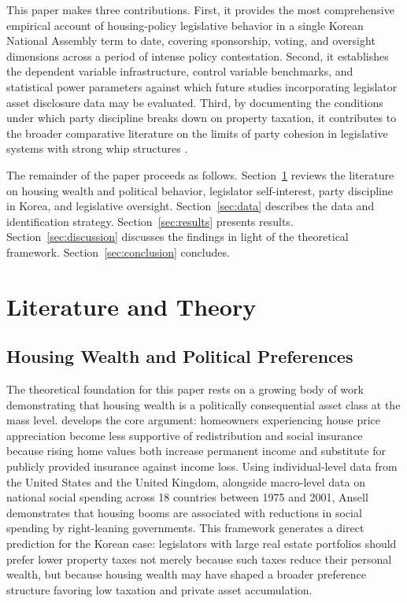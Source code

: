\documentclass[11pt]{article}
\begin{document}
This paper makes three contributions. First, it provides the most comprehensive empirical account of housing-policy legislative behavior in a single Korean National Assembly term to date, covering sponsorship, voting, and oversight dimensions across a period of intense policy contestation. Second, it establishes the dependent variable infrastructure, control variable benchmarks, and statistical power parameters against which future studies incorporating legislator asset disclosure data may be evaluated. Third, by documenting the conditions under which party discipline breaks down on property taxation, it contributes to the broader comparative literature on the limits of party cohesion in legislative systems with strong whip structures \citep{shinLee2015, kangPark2025}.

The remainder of the paper proceeds as follows. Section~\ref{sec:lit} reviews the literature on housing wealth and political behavior, legislator self-interest, party discipline in Korea, and legislative oversight. Section~\ref{sec:data} describes the data and identification strategy. Section~\ref{sec:results} presents results. Section~\ref{sec:discussion} discusses the findings in light of the theoretical framework. Section~\ref{sec:conclusion} concludes.


\section{Literature and Theory}
\label{sec:lit}

\subsection{Housing Wealth and Political Preferences}

The theoretical foundation for this paper rests on a growing body of work demonstrating that housing wealth is a politically consequential asset class at the mass level. \citet{ansell2014} develops the core argument: homeowners experiencing house price appreciation become less supportive of redistribution and social insurance because rising home values both increase permanent income and substitute for publicly provided insurance against income loss. Using individual-level data from the United States and the United Kingdom, alongside macro-level data on national social spending across 18 countries between 1975 and 2001, Ansell demonstrates that housing booms are associated with reductions in social spending by right-leaning governments. This framework generates a direct prediction for the Korean case: legislators with large real estate portfolios should prefer lower property taxes not merely because such taxes reduce their personal wealth, but because housing wealth may have shaped a broader preference structure favoring low taxation and private asset accumulation.
\end{document}
